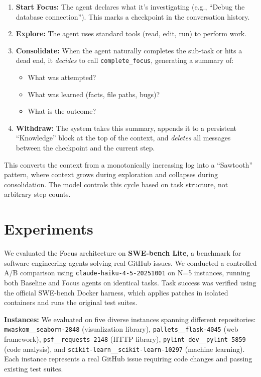\documentclass[conference]{IEEEtran}
\begin{document}
\begin{enumerate}
    \item \textbf{Start Focus:} The agent declares what it's investigating (e.g., ``Debug the database connection''). This marks a checkpoint in the conversation history.
    \item \textbf{Explore:} The agent uses standard tools (read, edit, run) to perform work.
    \item \textbf{Consolidate:} When the agent naturally completes the sub-task or hits a dead end, it \textit{decides} to call \texttt{complete\_focus}, generating a summary of:
    \begin{itemize}
        \item What was attempted?
        \item What was learned (facts, file paths, bugs)?
        \item What is the outcome?
    \end{itemize}
    \item \textbf{Withdraw:} The system takes this summary, appends it to a persistent ``Knowledge'' block at the top of the context, and \textit{deletes} all messages between the checkpoint and the current step.
\end{enumerate}

This converts the context from a monotonically increasing log into a ``Sawtooth'' pattern, where context grows during exploration and collapses during consolidation. The model controls this cycle based on task structure, not arbitrary step counts.

\section{Experiments}
We evaluated the Focus architecture on \textbf{SWE-bench Lite}, a benchmark for software engineering agents solving real GitHub issues. We conducted a controlled A/B comparison using \texttt{claude-haiku-4-5-20251001} on N=5 instances, running both Baseline and Focus agents on identical tasks. Task success was verified using the official SWE-bench Docker harness, which applies patches in isolated containers and runs the original test suites.

\textbf{Instances:} We evaluated on five diverse instances spanning different repositories: \texttt{mwaskom\_\_seaborn-2848} (visualization library), \texttt{pallets\_\_flask-4045} (web framework), \texttt{psf\_\_requests-2148} (HTTP library), \texttt{pylint-dev\_\_pylint-5859} (code analysis), and \texttt{scikit-learn\_\_scikit-learn-10297} (machine learning). Each instance represents a real GitHub issue requiring code changes and passing existing test suites.
\end{document}
